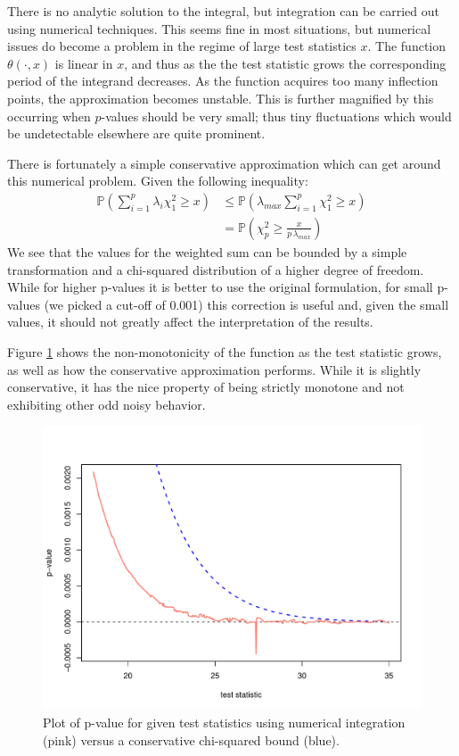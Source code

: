 There is no analytic solution to the integral, but integration can be carried out using numerical techniques. This seems
fine in most situations, but numerical issues do become a problem in the regime of large test statistics $x$. The function
$\theta(\cdot, x)$ is linear in $x$, and thus as the the test statistic grows the corresponding period of the integrand 
decreases. As the function acquires too many inflection points, the approximation becomes unstable. This is further
magnified by this occurring when $p$-values should be very small; thus tiny fluctuations which would be undetectable
elsewhere are quite prominent. 

There is fortunately a simple conservative approximation which can get around this numerical problem. Given the
following inequality:
\begin{align}
\mathbb{P} \left(\sum_{i=1}^{p} \lambda_i \chi^2_1 \geq x \right) &\leq \mathbb{P} \left( \lambda_{max} \sum_{i=1}^{p} \chi^2_1 \geq x \right) \\
&= \mathbb{P} \left(\chi^2_p \geq \frac{x}{p \, \lambda_{max}} \right)
\end{align}
We see that the values for the weighted sum can be bounded by a simple transformation and a chi-squared distribution
of a higher degree of freedom. While for higher p-values it is better to use the original formulation, for small
p-values (we picked a cut-off of 0.001) this correction is useful and, given the small values, it should not
greatly affect the interpretation of the results.

Figure \ref{cvmissues} shows the non-monotonicity of the function as the test statistic grows, as well as how the
conservative approximation performs. While it is slightly conservative, it has the nice property of being strictly
monotone and not exhibiting other odd noisy behavior.

\begin{figure}
\begin{center}
\includegraphics[scale=0.4]{fig1.pdf}
\end{center}
\caption{Plot of p-value for given test statistics using numerical integration
(pink) versus a conservative chi-squared bound (blue). }
\label{cvmissues}
\end{figure}


